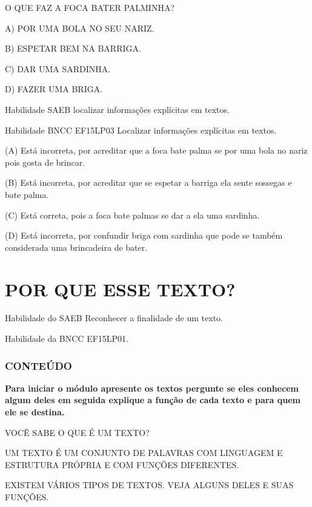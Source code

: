\begin{escola}
O QUE FAZ A FOCA BATER PALMINHA?

A) POR UMA BOLA NO SEU NARIZ.

B) ESPETAR BEM NA BARRIGA.

C) DAR UMA SARDINHA.

D) FAZER UMA BRIGA.

\protect\hypertarget{_heading=h.3j2qqm3}{}{}Habilidade SAEB localizar
informações explícitas em textos.

Habilidade BNCC EF15LP03 Localizar informações explícitas em textos.

(A) Está incorreta, por acreditar que a foca bate palma se por uma bola
no nariz pois gosta de brincar.

(B) Está incorreta, por acreditar que se espetar a barriga ela sente
sossegas e bate palma.

(C) Está correta, pois a foca bate palmas se dar a ela uma sardinha.

(D) Está incorreta, por confundir briga com sardinha que pode se também
considerada uma brincadeira de bater.

\chapter{POR QUE ESSE TEXTO?}

\protect\hypertarget{_heading=h.4i7ojhp}{}{}Habilidade do SAEB
Reconhecer a finalidade de um texto.

Habilidade da BNCC
EF15LP01.

\subsection{CONTEÚDO}\label{conteuxfado-3}

\textbf{Para iniciar o módulo apresente os textos pergunte se eles
conhecem algum deles em seguida explique a função de cada texto e para
quem ele se destina.}

VOCÊ SABE O QUE É UM TEXTO?

UM TEXTO É UM CONJUNTO DE PALAVRAS COM LINGUAGEM E ESTRUTURA PRÓPRIA E
COM FUNÇÕES DIFERENTES.

EXISTEM VÁRIOS TIPOS DE TEXTOS. VEJA ALGUNS DELES E SUAS FUNÇÕES.


\end{escola}
